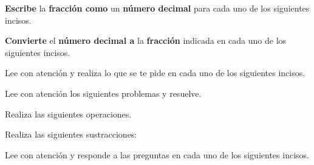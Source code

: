 \documentclass[11pt,addpoints]{exam}
\begin{document}

\begin{questions}
    \textbf{Escribe} la \textbf{fracción como} un \textbf{n\'umero decimal} para cada uno de los siguientes incisos.
    \begin{multicols}{2}
        \begin{parts}
            
            
        \end{parts}
    \end{multicols}
    \newpage
    \textbf{Convierte} el \textbf{n\'umero decimal a} la \textbf{fracción} indicada en cada uno de los siguientes incisos.

    \begin{multicols}{2}
        \begin{parts}
            
            
        \end{parts}
    \end{multicols}

    Lee con atenci\'on y realiza lo que se te pide en cada uno de los siguientes incisos.
    \begin{multicols}{2}
        \begin{parts}
            
            
        \end{parts}
    \end{multicols}

    Lee con atenci\'on los siguientes problemas y resuelve.

    \begin{parts}
        
        
    \end{parts}
    \newpage
    Realiza las siguientes operaciones.
    \begin{multicols}{2}
        \begin{parts}
            
            
        \end{parts}
    \end{multicols}

    Realiza las siguientes sustracciones:
    \begin{multicols}{2}
        \begin{parts}
            
            
        \end{parts}
    \end{multicols}
    \newpage
    Lee con atenci\'on y responde a las preguntas en cada uno de los siguientes incisos.


\end{questions}
\end{document}
